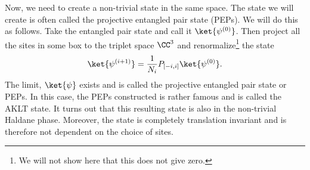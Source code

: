 Now, we need to create a non-trivial state in the same space. The state we will create is often called the projective entangled pair state (PEPs)\cite{Cirac_2021}. We will do this as follows. Take the entangled pair state and call it $\ket{\psi^{(0)}}$. Then project all the sites in some box to the triplet space $\CC^3$ and renormalize\footnote{We will not show here that this does not give zero.} the state
\begin{equation}
	\ket{\psi^{(i+1)}}=\frac{1}{N_i}P_{[-i,i]}\ket{\psi^{(0)}}.
\end{equation}
The limit, $\ket{\psi}$ exists and is called the projective entangled pair state or PEPs. In this case, the PEPs constructed is rather famous and is called the AKLT state. It turns out that this resulting state is also in the non-trivial Haldane phase. Moreover, the state is completely translation invariant and is therefore not dependent on the choice of sites.
